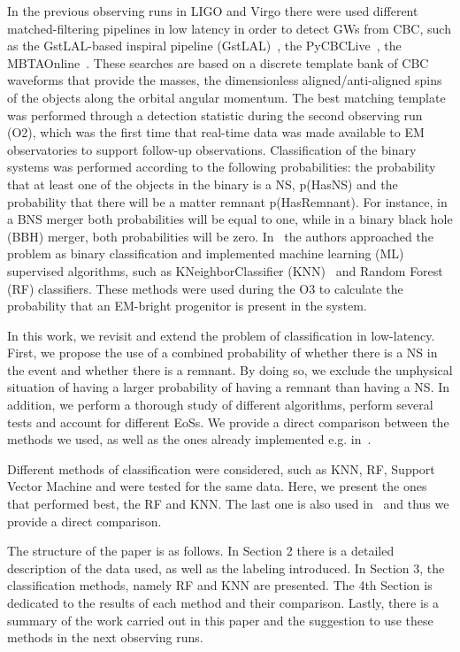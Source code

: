  
In the previous observing runs in LIGO and Virgo there were used different matched-filtering pipelines in low latency in order to detect GWs from CBC, such as the GstLAL-based inspiral pipeline (GstLAL)~\cite{Sachdev:2020lfd}, the PyCBCLive~\cite{Nitz_2018}, the MBTAOnline~\cite{Adams_2016}. These searches are based on a discrete template bank of CBC waveforms that provide the masses, the dimensionless aligned/anti-aligned spins of the objects along the orbital angular momentum. The best matching template was performed through a detection statistic during the second observing run (O2), which was the first time that real-time data was made available to EM observatories to support follow-up observations. Classification of the binary systems was performed according to the following probabilities: the probability that at least one of the objects in the binary is a NS, p(HasNS) and the probability that there will be a matter remnant p(HasRemnant). For instance, in a BNS merger both probabilities will be equal to one, while in a binary black hole (BBH) merger, both probabilities will be zero. In~\cite{Chatterjee:2019avs} the authors approached the problem as binary classification and implemented machine learning (ML) supervised algorithms, such as KNeighborClassifier (KNN)~\cite{Pedregosa:2011ork} and Random Forest (RF) classifiers. These methods were used during the O3 to calculate the probability that an EM-bright progenitor is present in the system.


In this work, we revisit and extend the problem of classification in low-latency. First, we propose the use of a combined probability of whether there is a NS in the event and whether there is a remnant. By doing so, we exclude the unphysical situation of having a larger probability of having a remnant than having a NS. In addition, we perform a thorough study of different algorithms, perform several tests and account for different EoSs. We provide a direct comparison between the methods we used, as well as the ones already implemented e.g. in~\cite{Chatterjee:2019avs}. 

Different methods of classification were considered, such as KNN, RF, Support Vector Machine and were tested for the same data. Here, we present the ones that performed best, the RF and KNN. The last one is also used in~\cite{Chatterjee:2019avs} and thus we provide a direct comparison. 

The structure of the paper is as follows. In Section 2 there is a detailed description of the data used, as well as the labeling introduced. In Section 3, the classification methods, namely RF and KNN are presented. The 4th Section is dedicated to the results of each method and their comparison. Lastly, there is a summary of the work carried out in this paper and the suggestion to use these methods in the next observing runs.
